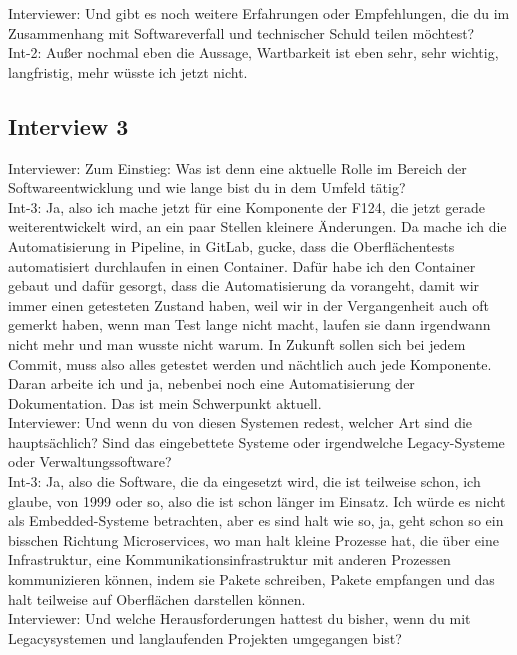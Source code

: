 Interviewer: Und gibt es noch weitere Erfahrungen oder Empfehlungen, die du im Zusammenhang mit Softwareverfall und technischer Schuld teilen möchtest? \\
Int-2: Außer nochmal eben die Aussage, Wartbarkeit ist eben sehr, sehr wichtig, langfristig, mehr wüsste ich jetzt nicht. \\

\subsection*{Interview 3}

Interviewer: Zum Einstieg: Was ist denn eine aktuelle Rolle im Bereich der Softwareentwicklung und wie lange bist du in dem Umfeld tätig? \\
Int-3: Ja, also ich mache jetzt für eine Komponente der F124, die jetzt gerade weiterentwickelt wird, an ein paar Stellen kleinere Änderungen. Da mache ich die Automatisierung in Pipeline, in GitLab, gucke, dass die Oberflächentests automatisiert durchlaufen in einen Container. Dafür habe ich den Container gebaut und dafür gesorgt, dass die Automatisierung da vorangeht, damit wir immer einen getesteten Zustand haben, weil wir in der Vergangenheit auch oft gemerkt haben, wenn man Test lange nicht macht, laufen sie dann irgendwann nicht mehr und man wusste nicht warum. In Zukunft sollen sich bei jedem Commit, muss also alles getestet werden und nächtlich auch jede Komponente. Daran arbeite ich und ja, nebenbei noch eine Automatisierung der Dokumentation. Das ist mein Schwerpunkt aktuell.\\
Interviewer: Und wenn du von diesen Systemen redest, welcher Art sind die hauptsächlich? Sind das eingebettete Systeme oder irgendwelche Legacy-Systeme oder Verwaltungssoftware?\\
Int-3: Ja, also die Software, die da eingesetzt wird, die ist teilweise schon, ich glaube, von 1999 oder so, also die ist schon länger im Einsatz. Ich würde es nicht als Embedded-Systeme betrachten, aber es sind halt wie so, ja, geht schon so ein bisschen Richtung Microservices, wo man halt kleine Prozesse hat, die über eine Infrastruktur, eine Kommunikationsinfrastruktur mit anderen Prozessen kommunizieren können, indem sie Pakete schreiben, Pakete empfangen und das halt teilweise auf Oberflächen darstellen können. \\
Interviewer: Und welche Herausforderungen hattest du bisher, wenn du mit Legacysystemen und langlaufenden Projekten umgegangen bist?\\
